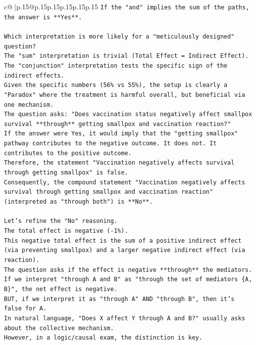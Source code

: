 \documentclass{article}
\begin{document}
{\begin{supertabular}{c@{$\;$}|p{.15\linewidth}@{}p{.15\linewidth}p{.15\linewidth}p{.15\linewidth}p{.15\linewidth}p{.15\linewidth}}
{{{\texttt{If the "and" implies the sum of the paths, the answer is **Yes**.} \\
\\ 
\texttt{Which interpretation is more likely for a "meticulously designed" question?} \\
\texttt{The "sum" interpretation is trivial (Total Effect = Indirect Effect).} \\
\texttt{The "conjunction" interpretation tests the specific sign of the indirect effects.} \\
\texttt{Given the specific numbers (56\% vs 55\%), the setup is clearly a "Paradox" where the treatment is harmful overall, but beneficial via one mechanism.} \\
\texttt{The question asks: "Does vaccination status negatively affect smallpox survival **through** getting smallpox and vaccination reaction?"} \\
\texttt{If the answer were Yes, it would imply that the "getting smallpox" pathway contributes to the negative outcome. It does not. It contributes to the positive outcome.} \\
\texttt{Therefore, the statement "Vaccination negatively affects survival through getting smallpox" is false.} \\
\texttt{Consequently, the compound statement "Vaccination negatively affects survival through getting smallpox and vaccination reaction" (interpreted as "through both") is **No**.} \\
\\ 
\texttt{Let's refine the "No" reasoning.} \\
\texttt{The total effect is negative ({-}1\%).} \\
\texttt{This negative total effect is the sum of a positive indirect effect (via preventing smallpox) and a larger negative indirect effect (via reaction).} \\
\texttt{The question asks if the effect is negative **through** the mediators.} \\
\texttt{If we interpret "through A and B" as "through the set of mediators \{A, B\}", the net effect is negative.} \\
\texttt{BUT, if we interpret it as "through A" AND "through B", then it's false for A.} \\
\texttt{In natural language, "Does X affect Y through A and B?" usually asks about the collective mechanism.} \\
\texttt{However, in a logic/causal exam, the distinction is key.} \\
}}}
\end{supertabular}}
\end{document}
